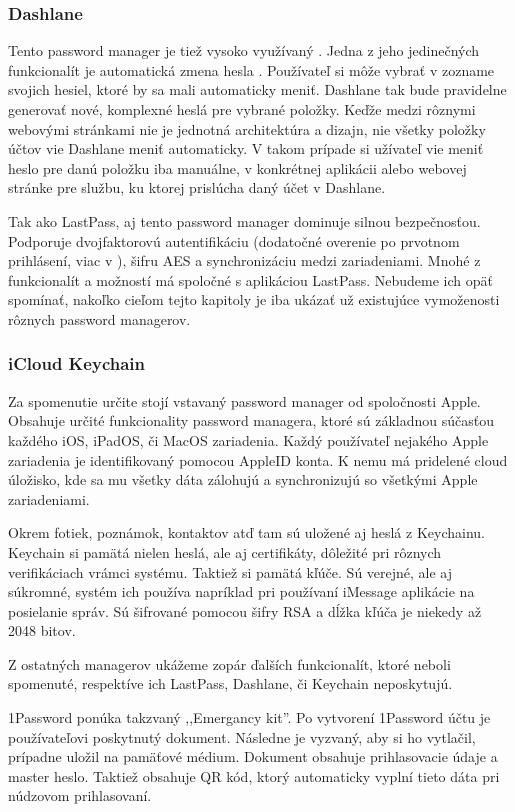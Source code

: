 \subsubsection{Dashlane}
Tento password manager je tiež vysoko využívaný \cite{15}. Jedna z jeho jedinečných funkcionalít je automatická zmena hesla \cite{16}. Používateľ si môže vybrať v zozname svojich hesiel, ktoré by sa mali automaticky meniť. Dashlane tak bude pravidelne generovať nové, komplexné heslá pre vybrané položky. Keďže medzi rôznymi webovými stránkami nie je jednotná architektúra a dizajn, nie všetky položky účtov vie Dashlane meniť automaticky. V takom prípade si užívateľ vie meniť heslo pre danú položku iba manuálne, v konkrétnej aplikácii alebo webovej stránke pre službu, ku ktorej prislúcha daný účet v Dashlane.
\par Tak ako LastPass, aj tento password manager dominuje silnou bezpečnosťou. Podporuje dvojfaktorovú autentifikáciu (dodatočné overenie po prvotnom prihlásení, viac v \cite{17}), šifru AES a synchronizáciu medzi zariadeniami. Mnohé z funkcionalít a možností má spoločné s aplikáciou LastPass. Nebudeme ich opäť spomínať, nakoľko cieľom tejto kapitoly je iba ukázať už existujúce vymoženosti rôznych password managerov.

\subsubsection{iCloud Keychain}
\par Za spomenutie určite stojí vstavaný password manager od spoločnosti Apple. Obsahuje určité funkcionality password managera, ktoré sú základnou súčasťou každého iOS, iPadOS, či MacOS zariadenia. Každý používateľ nejakého Apple zariadenia je identifikovaný pomocou AppleID konta. K nemu má pridelené cloud úložisko, kde sa mu všetky dáta zálohujú a synchronizujú so všetkými Apple zariadeniami.
\par Okrem fotiek, poznámok, kontaktov atď tam sú uložené aj heslá z Keychainu. Keychain si pamätá nielen heslá, ale aj certifikáty, dôležité pri rôznych verifikáciach vrámci systému. Taktiež si pamätá kľúče. Sú verejné, ale aj súkromné, systém ich používa napríklad pri používaní iMessage aplikácie na posielanie správ. Sú šifrované pomocou šifry RSA a dĺžka kľúča je niekedy až 2048 bitov. \\

\par Z ostatných managerov ukážeme zopár ďalších funkcionalít, ktoré neboli spomenuté, respektíve ich LastPass, Dashlane, či Keychain neposkytujú.
\par 1Password ponúka takzvaný ,,Emergancy kit''. Po vytvorení 1Password účtu je používateľovi poskytnutý dokument. Následne je vyzvaný, aby si ho vytlačil, prípadne uložil na pamäťové médium. Dokument obsahuje prihlasovacie údaje a master heslo. Taktiež obsahuje QR kód, ktorý automaticky vyplní tieto dáta pri núdzovom prihlasovaní. \\

